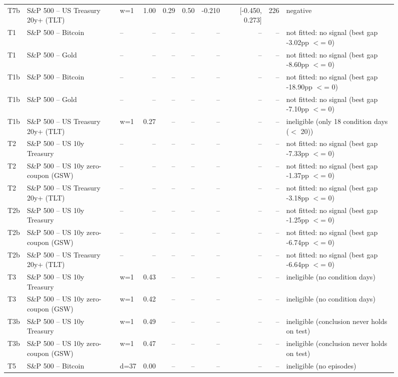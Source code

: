 \begin{figure}
\begin{tabular}{lllrrrrrrl}
T7b & S\&P 500 -- US Treasury 20y+ (TLT) & w=1 & 1.00 & 0.29 & 0.50 & -0.210 & [-0.450, 0.273] & 226 & negative \\
T1 & S\&P 500 -- Bitcoin & -- & -- & -- & -- & -- & -- & -- & not fitted: no signal (best gap -3.02pp $<$= 0) \\
T1 & S\&P 500 -- Gold & -- & -- & -- & -- & -- & -- & -- & not fitted: no signal (best gap -8.60pp $<$= 0) \\
T1b & S\&P 500 -- Bitcoin & -- & -- & -- & -- & -- & -- & -- & not fitted: no signal (best gap -18.90pp $<$= 0) \\
T1b & S\&P 500 -- Gold & -- & -- & -- & -- & -- & -- & -- & not fitted: no signal (best gap -7.10pp $<$= 0) \\
T1b & S\&P 500 -- US Treasury 20y+ (TLT) & w=1 & 0.27 & -- & -- & -- & -- & -- & ineligible (only 18 condition days ($<$ 20)) \\
T2 & S\&P 500 -- US 10y Treasury & -- & -- & -- & -- & -- & -- & -- & not fitted: no signal (best gap -7.33pp $<$= 0) \\
T2 & S\&P 500 -- US 10y zero-coupon (GSW) & -- & -- & -- & -- & -- & -- & -- & not fitted: no signal (best gap -1.37pp $<$= 0) \\
T2 & S\&P 500 -- US Treasury 20y+ (TLT) & -- & -- & -- & -- & -- & -- & -- & not fitted: no signal (best gap -3.18pp $<$= 0) \\
T2b & S\&P 500 -- US 10y Treasury & -- & -- & -- & -- & -- & -- & -- & not fitted: no signal (best gap -1.25pp $<$= 0) \\
T2b & S\&P 500 -- US 10y zero-coupon (GSW) & -- & -- & -- & -- & -- & -- & -- & not fitted: no signal (best gap -6.74pp $<$= 0) \\
T2b & S\&P 500 -- US Treasury 20y+ (TLT) & -- & -- & -- & -- & -- & -- & -- & not fitted: no signal (best gap -6.64pp $<$= 0) \\
T3 & S\&P 500 -- US 10y Treasury & w=1 & 0.43 & -- & -- & -- & -- & -- & ineligible (no condition days) \\
T3 & S\&P 500 -- US 10y zero-coupon (GSW) & w=1 & 0.42 & -- & -- & -- & -- & -- & ineligible (no condition days) \\
T3b & S\&P 500 -- US 10y Treasury & w=1 & 0.49 & -- & -- & -- & -- & -- & ineligible (conclusion never holds on test) \\
T3b & S\&P 500 -- US 10y zero-coupon (GSW) & w=1 & 0.47 & -- & -- & -- & -- & -- & ineligible (conclusion never holds on test) \\
T5 & S\&P 500 -- Bitcoin & d=37 & 0.00 & -- & -- & -- & -- & -- & ineligible (no episodes) \\

\end{tabular}
\end{figure}
